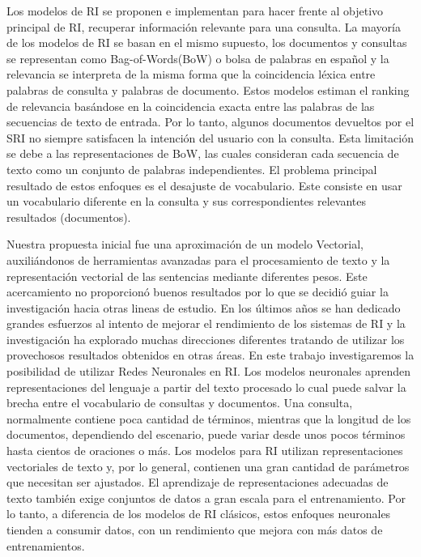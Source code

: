 \documentclass{llncs}
\begin{document}
Los modelos de RI se proponen e implementan para hacer frente al objetivo principal de RI, recuperar información relevante para una consulta. La mayoría de los modelos de RI se basan en el mismo supuesto, los documentos y consultas se representan como Bag-of-Words(BoW) o bolsa de palabras en español y la relevancia se interpreta de la misma forma que la coincidencia léxica entre palabras de consulta y palabras de documento. Estos modelos estiman el ranking de relevancia basándose en la coincidencia exacta entre las palabras de las secuencias de texto de entrada. Por lo tanto, algunos documentos devueltos por el SRI no siempre satisfacen la intención del usuario con la consulta. Esta limitación se debe a las representaciones de BoW, las cuales consideran cada secuencia de texto como un conjunto de palabras independientes. El problema principal resultado de estos enfoques es el desajuste de vocabulario. Este consiste en usar un vocabulario diferente en la consulta y sus correspondientes relevantes resultados (documentos).

Nuestra propuesta inicial fue una aproximación de un modelo Vectorial, auxiliándonos de herramientas avanzadas para el procesamiento de texto y la representación vectorial de las sentencias mediante diferentes pesos. Este acercamiento no proporcionó buenos resultados por lo que se decidió guiar la investigación hacia otras lineas de estudio.
En los últimos años se han dedicado grandes esfuerzos al intento de mejorar el rendimiento de los sistemas de RI y la investigación ha explorado muchas direcciones diferentes tratando de utilizar los provechosos resultados obtenidos en otras áreas. En este trabajo investigaremos la posibilidad de utilizar Redes Neuronales en RI. 
Los modelos neuronales aprenden representaciones del lenguaje a partir del texto procesado lo cual puede salvar la brecha entre el vocabulario de consultas y documentos. Una consulta, normalmente contiene poca cantidad de términos, mientras que la longitud de los documentos, dependiendo del escenario, puede variar desde unos pocos términos hasta cientos de oraciones o más. Los modelos para RI utilizan representaciones vectoriales de texto y, por lo general, contienen una gran cantidad de parámetros que necesitan ser ajustados. El aprendizaje de representaciones adecuadas de texto también exige conjuntos de datos a gran escala para el entrenamiento. Por lo tanto, a diferencia de los modelos de RI clásicos, estos enfoques neuronales tienden a consumir datos, con un rendimiento que mejora con más datos de entrenamientos.
\end{document}
